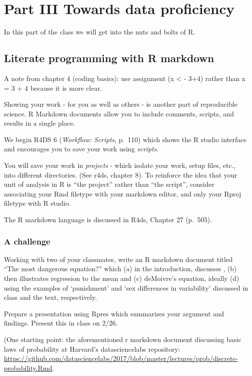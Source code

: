 \documentclass[]{book}
\theoremstyle{definition}
\theoremstyle{definition}
\theoremstyle{definition}
\theoremstyle{remark}
\begin{document}
\part{Part III Towards data
proficiency}\label{part-part-iii-towards-data-proficiency}

In this part of the class we will get into the nuts and bolts of R.

\chapter{Literate programming with R
markdown}\label{literate-programming-with-r-markdown}

A note from chapter 4 (coding basics): use assignment (x \textless{} -
3+4) rather than x = 3 + 4 because it is more clear.

Showing your work - for you as well as others - is another part of
reproducible science. R Markdown documents allow you to include
comments, scripts, and results in a single place.

We begin R4DS 6 (\emph{Workflow: Scripts}, p.~110) which shows the R
studio interface and encourages you to save your work using
\emph{scripts}.

You will save your work in \emph{projects} - which isolate your work,
setup files, etc., into different directories. (See r4ds, chapter 8). To
reinforce the idea that your unit of analysis in R is ``the project''
rather than ``the script'', consider associating your Rmd filetype with
your markdown editor, and only your Rproj filetype with R studio.

The R markdown language is discussed in R4ds, Chapter 27 (p.~505).

\section{A challenge}\label{a-challenge-1}

Working with two of your classmates, write an R markdown document titled
``The most dangerous equation?'' which (a) in the introduction,
discusses \citet{wainer2007most}, (b) then illustrates regression to the
mean and (c) deMoivre's equation, ideally (d) using the examples of
`punishment' and `sex differences in variability' discussed in class and
the text, respectively.

Prepare a presentation using Rpres which summarizes your argument and
findings. Present this in class on 2/26.

(One starting point: the aforementioned r markdown document discussing
basic laws of probability at Harvard's datasciencelabs repository:
\url{https://github.com/datasciencelabs/2017/blob/master/lectures/prob/discrete-probability.Rmd}.
\end{document}
